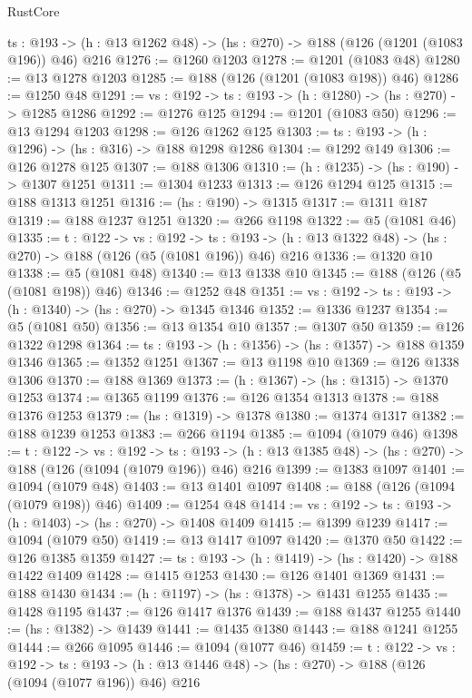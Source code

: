 \begin{lexlean}{RustCore}
\begin{coremodule}
  {ts : @193} -> (h : @13 @1262 @48) -> (hs : @270) -> @188 (@126 (@1201 (@1083 @196)) @46) @216
@1276 := @1260 @1203
@1278 := @1201 (@1083 @48)
@1280 := @13 @1278 @1203
@1285 := @188 (@126 (@1201 (@1083 @198)) @46)
@1286 := @1250 @48
@1291 := {vs : @192} -> {ts : @193} -> (h : @1280) -> (hs : @270) -> @1285 @1286
@1292 := @1276 @125
@1294 := @1201 (@1083 @50)
@1296 := @13 @1294 @1203
@1298 := @126 @1262 @125
@1303 := {ts : @193} -> (h : @1296) -> (hs : @316) -> @188 @1298 @1286
@1304 := @1292 @149
@1306 := @126 @1278 @125
@1307 := @188 @1306
@1310 := (h : @1235) -> (hs : @190) -> @1307 @1251
@1311 := @1304 @1233
@1313 := @126 @1294 @125
@1315 := @188 @1313 @1251
@1316 := (hs : @190) -> @1315
@1317 := @1311 @187
@1319 := @188 @1237 @1251
@1320 := @266 @1198
@1322 := @5 (@1081 @46)
@1335 := {t : @122} ->
  {vs : @192} ->
  {ts : @193} -> (h : @13 @1322 @48) -> (hs : @270) -> @188 (@126 (@5 (@1081 @196)) @46) @216
@1336 := @1320 @10
@1338 := @5 (@1081 @48)
@1340 := @13 @1338 @10
@1345 := @188 (@126 (@5 (@1081 @198)) @46)
@1346 := @1252 @48
@1351 := {vs : @192} -> {ts : @193} -> (h : @1340) -> (hs : @270) -> @1345 @1346
@1352 := @1336 @1237
@1354 := @5 (@1081 @50)
@1356 := @13 @1354 @10
@1357 := @1307 @50
@1359 := @126 @1322 @1298
@1364 := {ts : @193} -> (h : @1356) -> (hs : @1357) -> @188 @1359 @1346
@1365 := @1352 @1251
@1367 := @13 @1198 @10
@1369 := @126 @1338 @1306
@1370 := @188 @1369
@1373 := (h : @1367) -> (hs : @1315) -> @1370 @1253
@1374 := @1365 @1199
@1376 := @126 @1354 @1313
@1378 := @188 @1376 @1253
@1379 := (hs : @1319) -> @1378
@1380 := @1374 @1317
@1382 := @188 @1239 @1253
@1383 := @266 @1194
@1385 := @1094 (@1079 @46)
@1398 := {t : @122} ->
  {vs : @192} ->
  {ts : @193} -> (h : @13 @1385 @48) -> (hs : @270) -> @188 (@126 (@1094 (@1079 @196)) @46) @216
@1399 := @1383 @1097
@1401 := @1094 (@1079 @48)
@1403 := @13 @1401 @1097
@1408 := @188 (@126 (@1094 (@1079 @198)) @46)
@1409 := @1254 @48
@1414 := {vs : @192} -> {ts : @193} -> (h : @1403) -> (hs : @270) -> @1408 @1409
@1415 := @1399 @1239
@1417 := @1094 (@1079 @50)
@1419 := @13 @1417 @1097
@1420 := @1370 @50
@1422 := @126 @1385 @1359
@1427 := {ts : @193} -> (h : @1419) -> (hs : @1420) -> @188 @1422 @1409
@1428 := @1415 @1253
@1430 := @126 @1401 @1369
@1431 := @188 @1430
@1434 := (h : @1197) -> (hs : @1378) -> @1431 @1255
@1435 := @1428 @1195
@1437 := @126 @1417 @1376
@1439 := @188 @1437 @1255
@1440 := (hs : @1382) -> @1439
@1441 := @1435 @1380
@1443 := @188 @1241 @1255
@1444 := @266 @1095
@1446 := @1094 (@1077 @46)
@1459 := {t : @122} ->
  {vs : @192} ->
  {ts : @193} -> (h : @13 @1446 @48) -> (hs : @270) -> @188 (@126 (@1094 (@1077 @196)) @46) @216

\end{coremodule}
\end{lexlean}
